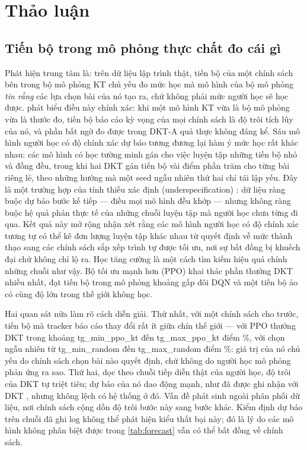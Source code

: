 \section{Thảo luận}\label{sec:discussion}

\subsection{Tiến bộ trong mô phỏng thực chất đo cái gì}

Phát hiện trung tâm là: trên dữ liệu lập trình thật, tiến bộ của một chính sách bên trong bộ mô phỏng KT chủ yếu đo mức học mà mô hình của bộ mô phỏng \emph{tin rằng} các lựa chọn bài của nó tạo ra, chứ không phải mức người học sẽ học được.  phát biểu điều này chính xác: khi một mô hình KT vừa là bộ mô phỏng vừa là thước đo, tiến bộ báo cáo kỳ vọng của mọi chính sách là độ trôi tích lũy của nó, và phần bất ngờ đo được trong DKT-A quả thực không đáng kể. Sáu mô hình người học có độ chính xác dự báo tương đương lại hàm ý mức học rất khác nhau: các mô hình có học tường minh gán cho việc luyện tập những tiến bộ nhỏ và đồng đều, trong khi hai DKT gán tiến bộ vài điểm phần trăm cho từng bài riêng lẻ, theo những hướng mà một seed ngẫu nhiên thứ hai chỉ tái lập yếu. Đây là một trường hợp của tính thiếu xác định (underspecification) \citep{damour2022underspecification}: dữ liệu ràng buộc dự báo bước kế tiếp — điều mọi mô hình đều khớp — nhưng không ràng buộc hệ quả phản thực tế của những chuỗi luyện tập mà người học chưa từng đi qua. Kết quả này mở rộng nhận xét rằng các mô hình người học có độ chính xác tương tự có thể kê đơn lượng luyện tập khác nhau \citep{lee2012individualizing,rollinson2015predictive} từ quyết định về mức thành thạo sang các chính sách sắp xếp trình tự được tối ưu, nơi sự bất đồng bị khuếch đại chứ không chỉ lộ ra. Học tăng cường là một cách tìm kiếm hiệu quả chính những chuỗi như vậy. Bộ tối ưu mạnh hơn (PPO) khai thác phần thưởng DKT nhiều nhất, đạt tiến bộ trong mô phỏng khoảng gấp đôi DQN và một tiến bộ ảo có cùng độ lớn trong thế giới không học.

Hai quan sát nữa làm rõ cách diễn giải. Thứ nhất, với một chính sách cho trước, tiến bộ mà tracker báo cáo thay đổi rất ít giữa chín thế giới — với PPO thưởng DKT trong khoảng {{tg_min_ppo_kt}} đến {{tg_max_ppo_kt}} điểm \%, với chọn ngẫu nhiên từ {{tg_min_random}} đến {{tg_max_random}} điểm \%: giá trị của nó chủ yếu do chính sách chọn bài nào quyết định, chứ không do người học mô phỏng phản ứng ra sao. Thứ hai, dọc theo chuỗi tiếp diễn thật của người học, độ trôi của DKT tự triệt tiêu; dự báo của nó dao động mạnh, như đã được ghi nhận với DKT \citep{yeung2018dktplus}, nhưng không lệch có hệ thống ở đó. Vấn đề phát sinh ngoài phân phối dữ liệu, nơi chính sách cộng dồn độ trôi bước này sang bước khác. Kiểm định dự báo trên chuỗi đã ghi log không thể phát hiện kiểu thất bại này; đó là lý do các mô hình không phân biệt được trong \cref{tab:forecast} vẫn có thể bất đồng về chính sách.

